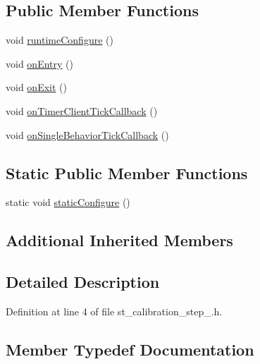 \subsection*{Public Member Functions}
\begin{DoxyCompactItemize}
\item 
void \hyperlink{structsm__respira__1_1_1StCalibrationStep1_a041c623fb452bde3f3abd51eb5d9a7e6}{runtime\+Configure} ()
\item 
void \hyperlink{structsm__respira__1_1_1StCalibrationStep1_ab5935eecf1ce4037e27816db8df8e224}{on\+Entry} ()
\item 
void \hyperlink{structsm__respira__1_1_1StCalibrationStep1_a8b1c4ef9870ba819fa32794ff7a52ef2}{on\+Exit} ()
\item 
void \hyperlink{structsm__respira__1_1_1StCalibrationStep1_a0076674470e3964b263531f3f41c73e6}{on\+Timer\+Client\+Tick\+Callback} ()
\item 
void \hyperlink{structsm__respira__1_1_1StCalibrationStep1_a5753db04586e997320c8e3916c6c2642}{on\+Single\+Behavior\+Tick\+Callback} ()
\end{DoxyCompactItemize}
\subsection*{Static Public Member Functions}
\begin{DoxyCompactItemize}
\item 
static void \hyperlink{structsm__respira__1_1_1StCalibrationStep1_a2e817276acf8ab351121f8459e00b0f2}{static\+Configure} ()
\end{DoxyCompactItemize}
\subsection*{Additional Inherited Members}


\subsection{Detailed Description}


Definition at line 4 of file st\+\_\+calibration\+\_\+step\+\_.\+h.



\subsection{Member Typedef Documentation}
\mbox{\label{structsm__respira__1_1_1StCalibrationStep1_a67c9271069e31b4c917e0f6c24256d34}} 
